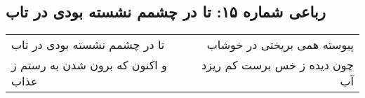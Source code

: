 \begin{center}
\section*{رباعی شماره ۱۵: تا در چشمم نشسته بودی در تاب}
\label{sec:sh015}
\begin{longtable}{l p{0.5cm} r}
تا در چشمم نشسته بودی در تاب
&&
پیوسته همی بریختی در خوشاب
\\
و اکنون که برون شدن به رستم ز عذاب
&&
چون دیده ز خس برست کم ریزد آب
\\
\end{longtable}
\end{center}
